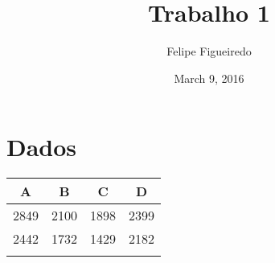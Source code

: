 \documentclass[]{article}
\title{Trabalho 1}
\author{Felipe Figueiredo}
\date{March 9, 2016}
\begin{document}
\maketitle


\section{Dados}\label{dados}

\begin{longtable}[c]{@{}cccc@{}}
\toprule
\begin{minipage}[b]{0.06\columnwidth}\centering\strut
A
\strut\end{minipage} &
\begin{minipage}[b]{0.06\columnwidth}\centering\strut
B
\strut\end{minipage} &
\begin{minipage}[b]{0.06\columnwidth}\centering\strut
C
\strut\end{minipage} &
\begin{minipage}[b]{0.06\columnwidth}\centering\strut
D
\strut\end{minipage}\tabularnewline
\midrule
\endhead
\begin{minipage}[t]{0.06\columnwidth}\centering\strut
2849
\strut\end{minipage} &
\begin{minipage}[t]{0.06\columnwidth}\centering\strut
2100
\strut\end{minipage} &
\begin{minipage}[t]{0.06\columnwidth}\centering\strut
1898
\strut\end{minipage} &
\begin{minipage}[t]{0.06\columnwidth}\centering\strut
2399
\strut\end{minipage}\tabularnewline
\begin{minipage}[t]{0.06\columnwidth}\centering\strut
2442
\strut\end{minipage} &
\begin{minipage}[t]{0.06\columnwidth}\centering\strut
1732
\strut\end{minipage} &
\begin{minipage}[t]{0.06\columnwidth}\centering\strut
1429
\strut\end{minipage} &
\begin{minipage}[t]{0.06\columnwidth}\centering\strut
2182
\strut\end{minipage}\tabularnewline
\begin{minipage}[t]{0.06\columnwidth}\centering\strut

\end{minipage}
\end{longtable}
\end{document}
